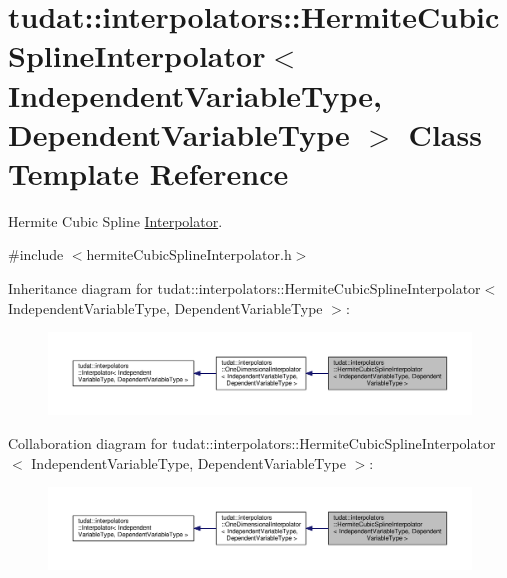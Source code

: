 \hypertarget{classtudat_1_1interpolators_1_1HermiteCubicSplineInterpolator}{}\section{tudat\+:\+:interpolators\+:\+:Hermite\+Cubic\+Spline\+Interpolator$<$ Independent\+Variable\+Type, Dependent\+Variable\+Type $>$ Class Template Reference}
\label{classtudat_1_1interpolators_1_1HermiteCubicSplineInterpolator}


Hermite Cubic Spline \hyperlink{classtudat_1_1interpolators_1_1Interpolator}{Interpolator}.  




{\ttfamily \#include $<$hermite\+Cubic\+Spline\+Interpolator.\+h$>$}



Inheritance diagram for tudat\+:\+:interpolators\+:\+:Hermite\+Cubic\+Spline\+Interpolator$<$ Independent\+Variable\+Type, Dependent\+Variable\+Type $>$\+:
\nopagebreak
\begin{figure}[H]
\begin{center}
\leavevmode
\includegraphics[width=350pt]{classtudat_1_1interpolators_1_1HermiteCubicSplineInterpolator__inherit__graph}
\end{center}
\end{figure}


Collaboration diagram for tudat\+:\+:interpolators\+:\+:Hermite\+Cubic\+Spline\+Interpolator$<$ Independent\+Variable\+Type, Dependent\+Variable\+Type $>$\+:
\nopagebreak
\begin{figure}[H]
\begin{center}
\leavevmode
\includegraphics[width=350pt]{classtudat_1_1interpolators_1_1HermiteCubicSplineInterpolator__coll__graph}
\end{center}
\end{figure}
